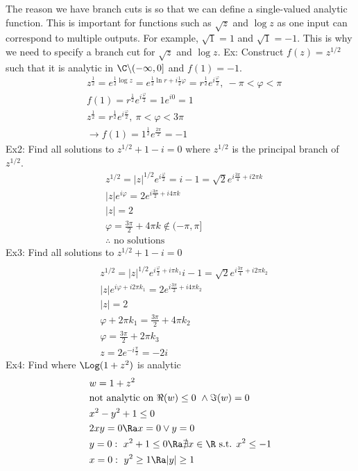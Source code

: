 The reason we have branch cuts is so that we can define a single-valued analytic function. This is important for functions such as $\sqrt{z}$ and $\log z$ as one input can correspond to multiple outputs. For example, $\sqrt{1}=1$ and $\sqrt{1}=-1$. This is why we need to specify a branch cut for $\sqrt{z}$ and $\log z$.
Ex: Construct $f(z)=z^{1/2}$ such that it is analytic in $\C\backslash(-\infty,0]$ and $f(1)=-1$.
\begin{align*}
    &z^\frac{1}{2}=e^{\frac{1}{2}\log z}=e^{\frac{1}{2}\ln r+i\frac{1}{2}\varphi}=r^\frac{1}{2}e^{i\frac{\varphi}{2}},\ -\pi<\varphi<\pi\\
    &f(1)=r^\frac{1}{2}e^{i\frac{\varphi}{2}}=1e^{i0}=1\\
    &z^\frac{1}{2}=r^\frac{1}{2}e^{i\frac{\varphi}{2}},\ \pi<\varphi<3\pi\\
    &\to f(1)=1^\frac{1}{2}e^{\frac{2\pi}{2}}=-1
\end{align*}
Ex2: Find all solutions to $z^{1/2}+1-i=0$ where $z^{1/2}$ is the principal branch of $z^{1/2}$.
\begin{align*}
    &z^{1/2}=|z|^{1/2}e^{i\frac{\varphi}{2}}=i-1=\sqrt{2}e^{i\frac{3\pi}{4}+i2\pi k}\\
    &|z|e^{i\varphi}=2e^{i\frac{3\pi}{2}+i4\pi k}\\
    &|z|=2\\
    &\varphi=\frac{3\pi}{2}+4\pi k\not\in(-\pi,\pi]\\
    &\therefore\text{ no solutions}
\end{align*}
Ex3: Find all solutions to $z^{1/2}+1-i=0$
\begin{align*}
    &\\
    &z^{1/2}=|z|^{1/2}e^{i\frac{\varphi}{2}+i\pi k_1}i-1=\sqrt{2}e^{i\frac{3\pi}{4}+i2\pi k_2}\\
    &|z|e^{i\varphi+i2\pi k_1}=2e^{i\frac{3\pi}{2}+i4\pi k_2}\\
    &|z|=2\\
    &\varphi+2\pi k_1=\frac{3\pi}{2}+4\pi k_2\\
    &\varphi=\frac{3\pi}{2}+2\pi k_3\\
    &z=2e^{-i\frac{\pi}{2}}=-2i
\end{align*}
Ex4: Find where $\Log(1+z^2)$ is analytic
\begin{align*}
    &w=1+z^2\\
    &\text{not analytic on }\Re(w)\leq0\ \wedge \Im(w)=0\\
    &x^2-y^2+1\leq0\\
    &2xy=0\Ra x=0 \vee y=0\\
    &y=0:\ x^2+1\leq 0\Ra \nexists x\in\R\text{ s.t. }x^2\leq-1\\
    &x=0:\ y^2\geq 1\Ra |y|\geq 1
\end{align*}

